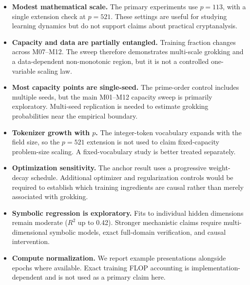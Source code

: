 \documentclass[11pt]{article}
\begin{document}
\begin{itemize}[leftmargin=*]
    \item \textbf{Modest mathematical scale.} The primary experiments use $p=113$, with a single extension check at $p=521$. These settings are useful for studying learning dynamics but do not support claims about practical cryptanalysis.

    \item \textbf{Capacity and data are partially entangled.} Training fraction changes across M07--M12. The sweep therefore demonstrates multi-scale grokking and a data-dependent non-monotonic region, but it is not a controlled one-variable scaling law.

    \item \textbf{Most capacity points are single-seed.} The prime-order control includes multiple seeds, but the main M01--M12 capacity sweep is primarily exploratory. Multi-seed replication is needed to estimate grokking probabilities near the empirical boundary.

    \item \textbf{Tokenizer growth with $p$.} The integer-token vocabulary expands with the field size, so the $p=521$ extension is not used to claim fixed-capacity problem-size scaling. A fixed-vocabulary study is better treated separately.

    \item \textbf{Optimization sensitivity.} The anchor result uses a progressive weight-decay schedule. Additional optimizer and regularization controls would be required to establish which training ingredients are causal rather than merely associated with grokking.

    \item \textbf{Symbolic regression is exploratory.} Fits to individual hidden dimensions remain moderate ($R^2$ up to 0.42). Stronger mechanistic claims require multi-dimensional symbolic models, exact full-domain verification, and causal intervention.

    \item \textbf{Compute normalization.} We report example presentations alongside epochs where available. Exact training FLOP accounting is implementation-dependent and is not used as a primary claim here.
\end{itemize}

\end{document}
